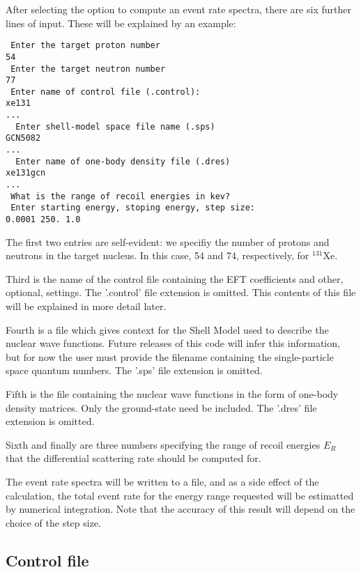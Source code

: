 \documentclass[11pt]{amsart}
\begin{document}
After selecting the option to compute an event rate spectra, there are six
further lines of input. These will be explained by an example:

\begin{verbatim}
 Enter the target proton number
54
 Enter the target neutron number 
77 
 Enter name of control file (.control):
xe131
...
  Enter shell-model space file name (.sps)
GCN5082
...
  Enter name of one-body density file (.dres)
xe131gcn
...
 What is the range of recoil energies in kev?
 Enter starting energy, stoping energy, step size:
0.0001 250. 1.0
\end{verbatim}

The first two entries are self-evident: we specifiy the number of protons and
neutrons in the target nucleus. In this case, 54 and 74, respectively, for
$^{131}$Xe.

Third is the name of the control file containing the EFT coefficients and other,
optional, settings. The '.control' file extension is omitted. This contents of
this file will be explained in more detail later.

Fourth is a file which gives context for the Shell Model used to describe the
nuclear wave functions. Future releases of this code will infer this
information, but for now the user must provide the filename containing the
single-particle space quantum numbers. The '.sps' file extension is omitted. 

Fifth is the file containing the nuclear wave functions in the form of one-body
density matrices. Only the ground-state need be included. The '.dres' file
extension is omitted. 

Sixth and finally are three numbers specifying the range of recoil energies
$E_R$ that the differential scattering rate should be computed for.

The event rate spectra will be written to a file, and as a side effect of the
calculation, the total event rate for the energy range requested will be
estimatted by numerical integration. Note that the accuracy of this result will
depend on the choice of the step size.

\subsection{Control file}
\end{document}
